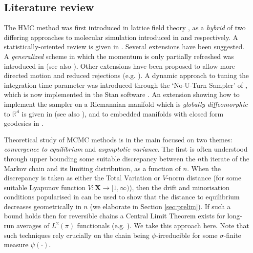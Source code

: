 \documentclass[bj,numbers,noshowframe]{imsart}
\newcommand{\X}{\mathbf{X}}
\newcommand{\R}{\mathbb{R}}
\theoremstyle{definition}
\theoremstyle{plain}
\theoremstyle{definition}
\begin{document}
\subsection{Literature review}
The HMC method was first introduced in lattice field theory \citep{duane1987hybrid}, as a \emph{hybrid} of two differing approaches to molecular simulation introduced in \citep{alder1959studies} and \citep{metropolis1953equation} respectively.  A statistically-oriented review is given in \citep{neal2011mcmc}.  Several extensions have been suggested. A \emph{generalized} scheme in which the momentum is only partially refreshed was introduced in \citep{horowitz1991generalized} (see also \citep{ottobre2016function}).  Other extensions have been proposed to allow more directed motion and reduced rejections (e.g. \citep{campos2015extra}).  A dynamic approach to tuning the integration time parameter was introduced through the `No-U-Turn Sampler' of \citep{hoffman-gelman:2013}, which is now implemented in the Stan software \citep{carpenter2016stan}.  An extension showing how to implement the sampler on a Riemannian manifold which is \emph{globally diffeomorphic} to $\R^d$ is given in \citep{girolami2011riemann} (see also \citep{betancourt2013general}), and to embedded manifolds with closed form geodesics in \citep{byrne2013geodesic}.

Theoretical study of MCMC methods is in the main focused on two themes: \emph{convergence to equilibrium} and \emph{asymptotic variance}.  The first is often understood through upper bounding some suitable discrepancy between the $n$th iterate of the Markov chain and its limiting distribution, as a function of $n$.  When the discrepancy is taken as either the Total Variation or $V$-norm distance (for some suitable Lyapunov function $V:\X \to [1,\infty)$), then the drift and minorisation conditions popularised in \citep{meyn2012markov} can be used to show that the distance to equilibrium decreases geometrically in $n$ (we elaborate in Section \ref{sec:prelim}).  If such a bound holds then for reversible chains a Central Limit Theorem exists for long-run averages of $L^2(\pi)$ functionals (e.g. \citep{roberts2004general}).  We take this approach here.  Note that such techniques rely crucially on the chain being $\psi$-irreducible for some $\sigma$-finite measure $\psi(\cdot)$.
\end{document}
